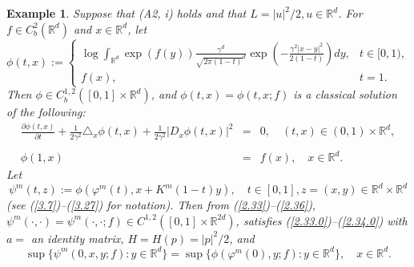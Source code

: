 \documentclass[12pt]{article}
\newtheorem{example}{Example}[section]
\begin{document}
\begin{example}\label{ex2.1}
Suppose that (A2, i) holds and that $L=|u|^2/2, u\in\mathbb{R}^d$. 
For $f\in C_b^2 (\mathbb{R}^d)$ and $x\in \mathbb{R}^d$, 
let 
\begin{equation}
\phi(t,x):=
\begin{cases}
\displaystyle \log \int_{\mathbb{R}^d}\exp (f(y)) \frac{\gamma^d}{\sqrt{2\pi (1-t)}^d}
\exp \left(-\frac{\gamma^{2}|x-y|^2}{2(1-t)}\right)dy,&t\in [0,1),\\
f(x),&t=1.
\end{cases}\label{2.33}
\end{equation}
Then $\phi\in C_b^{1,2}([0,1]\times \mathbb{R}^d)$, and 
$\phi(t,x)=\phi(t,x;f)$ is a classical solution of the following:
\begin{eqnarray}
\frac{\partial\phi(t,x)}{\partial t}+\frac{1}{2\gamma^2}\triangle_x\phi(t,x)+\frac{1}{2\gamma^2}|D_x\phi(t,x)|^2&=&0,
 \quad (t,x)\in (0,1)\times\mathbb{R}^d,\nonumber\\
 \label{2.37}\\
 \phi(1,x)&=&f(x), \quad x\in \mathbb{R}^d.
\end{eqnarray}
Let
\begin{equation}
\psi^m(t,z):=\phi(\varphi^m (t),x+K^m(1-t)y),\quad t\in [0,1], z=(x,y)\in \mathbb{R}^d\times \mathbb{R}^d\label{2.36}
\end{equation}
(see (\ref{3.7})--(\ref{3.27}) for notation).
Then  from (\ref{2.33})--(\ref{2.36}), $\psi^m(\cdot,\cdot)=\psi^m(\cdot,\cdot;f)\in C^{1,2} ([0,1]\times \mathbb{R}^{2d})$, satisfies (\ref{2.33.0})--(\ref{2.34.0}) with $a=$ an identity matrix, $H=H(p)=|p|^2/2$, and 
\begin{equation}\label{2.41}
\sup\{\psi^m(0,x,y;f):y\in\mathbb{R}^d \} 
=\sup\{\phi(\varphi^m (0),y;f):y\in\mathbb{R}^d \},\quad x\in\mathbb{R}^d.
\end{equation}


\end{example}
\end{document}
